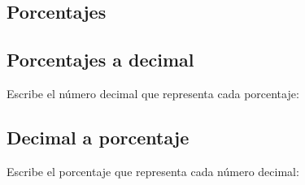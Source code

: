 \documentclass[12pt,addpoints]{evalua}
\begin{document}
\begin{questions}
	\section{Porcentajes}

      
	\subsection{Porcentajes a decimal}


      \question[4] Escribe el número decimal que representa cada porcentaje:

      \begin{multicols}{2}
      \end{multicols}

      
	\subsection{Decimal a porcentaje}

      \question[4] Escribe el porcentaje que representa cada número decimal:

      \begin{multicols}{2}
\end{multicols}
\end{questions}
\end{document}
